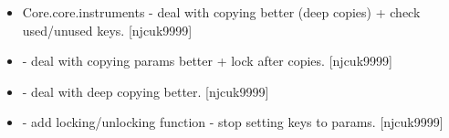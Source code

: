 \documentclass[a4paper,10pt,english]{report}
\begin{document}
\begin{itemize}
\item {} 
Core.core.instruments - deal with copying better (deep copies) + check
used/unused keys. {[}njcuk9999{]}

\item {} 
 - deal with copying params better + lock
after copies. {[}njcuk9999{]}

\item {} 
 - deal with deep copying better. {[}njcuk9999{]}

\item {} 
 - add locking/unlocking function -
stop setting keys to params. {[}njcuk9999{]}

\end{itemize}
\end{document}
